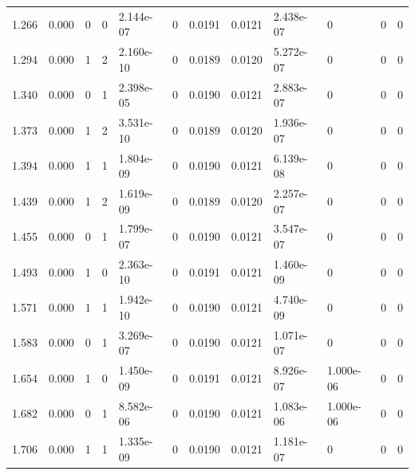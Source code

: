 \documentclass[preview]{standalone}
\begin{document}
{{\begin{tabular}{L{1.2cm}C{1.2cm} C{0.3cm}C{0.5cm} C{1.4cm}C{1.4cm} C{1.4cm}C{1.4cm} C{1.6cm}C{1.6cm} C{1.6cm}C{1.6cm}}
  1.266  &  0.000  & 0     &  0 &  2.144e-07  & 0  &  0.0191&   0.0121& 2.438e-07 & 0   &  0 & 0  \\ 
  1.294  &  0.000  & 1     &  2 &  2.160e-10  & 0  &  0.0189&   0.0120& 5.272e-07 & 0   &  0 & 0  \\ 
  1.340  &  0.000  & 0     &  1 &  2.398e-05  & 0  &  0.0190&   0.0121& 2.883e-07 & 0   &  0 & 0  \\ 
  1.373  &  0.000  & 1     &  2 &  3.531e-10  & 0  &  0.0189&   0.0120& 1.936e-07 & 0   &  0 & 0  \\ 
  1.394  &  0.000  & 1     &  1 &  1.804e-09  & 0  &  0.0190&   0.0121& 6.139e-08 & 0   &  0 & 0  \\ 
  1.439  &  0.000  & 1     &  2 &  1.619e-09  & 0  &  0.0189&   0.0120& 2.257e-07 & 0   &  0 & 0  \\ 
  1.455  &  0.000  & 0     &  1 &  1.799e-07  & 0  &  0.0190&   0.0121& 3.547e-07 & 0   &  0 & 0  \\ 
  1.493  &  0.000  & 1     &  0 &  2.363e-10  & 0  &  0.0191&   0.0121& 1.460e-09 & 0   &  0 & 0  \\ 
  1.571  &  0.000  & 1     &  1 &  1.942e-10  & 0  &  0.0190&   0.0121& 4.740e-09 & 0   &  0 & 0  \\ 
  1.583  &  0.000  & 0     &  1 &  3.269e-07  & 0  &  0.0190&   0.0121& 1.071e-07 & 0   &  0 & 0  \\ 
  1.654  &  0.000  & 1     &  0 &  1.450e-09  & 0  &  0.0191&   0.0121& 8.926e-07 & 1.000e-06   &  0 & 0  \\ 
  1.682  &  0.000  & 0     &  1 &  8.582e-06  & 0  &  0.0190&   0.0121& 1.083e-06 & 1.000e-06   &  0 & 0  \\ 
  1.706  &  0.000  & 1     &  1 &  1.335e-09  & 0  &  0.0190&   0.0121& 1.181e-07 & 0   &  0 & 0  \\ 
\hline 
\end{tabular} 

}}
\end{document}
